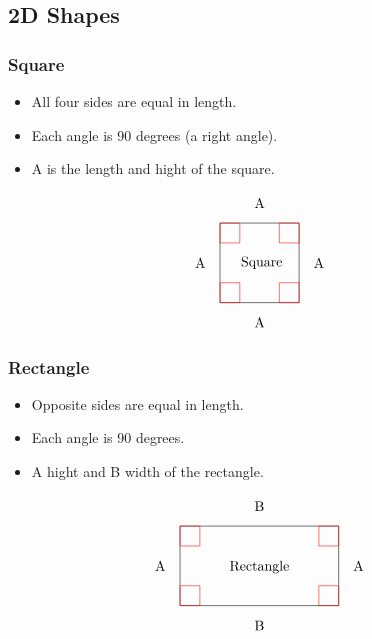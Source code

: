 \subsection{2D Shapes}
\subsubsection{Square}
\begin{itemize}
    \item All four sides are equal in length.
    \item Each angle is 90 degrees (a right angle).
    \item A is the length and hight of the square.
\end{itemize}

\[
\begin{tikzpicture}
    \draw (0,0) rectangle (2,2);

    \node (A) at (-.5,1) {A};
    \draw[red] (0,0) rectangle (0.5,0.5);
    \node (A) at (2.5,1) {A};
    \draw[red] (1.5,0) rectangle (2,0.5);
    \node (B) at (1,-.5) {A};
    \draw[red] (0,1.5) rectangle (0.5,2);
    \node (C) at (1,2.5) {A};
    \draw[red] (1.5,1.5) rectangle (2,2);

    \node[left] at (1.7,1) {Square};
\end{tikzpicture}
\]

\subsubsection{Rectangle}
\begin{itemize}
    \item Opposite sides are equal in length.
    \item Each angle is 90 degrees.
    \item A hight and B width of the rectangle.
\end{itemize}

\[
\begin{tikzpicture}
    \draw (0,0) -- (4,0) -- (4,2) -- (0,2) -- cycle;
    \node[below] at (2,1.25) {Rectangle};
    \node (A) at (-.5,1) {A};
    \draw[red] (0,0) rectangle (0.5,0.5);
    \node (A) at (4.5,1) {A};
    \draw[red] (3.5,0) rectangle (4,0.5);
    \node (B) at (2,-.5) {B};
    \draw[red] (0,1.5) rectangle (0.5,2);
    \node (C) at (2,2.5) {B};   
    \draw[red] (3.5,1.5) rectangle (4,2);
\end{tikzpicture}
\]
